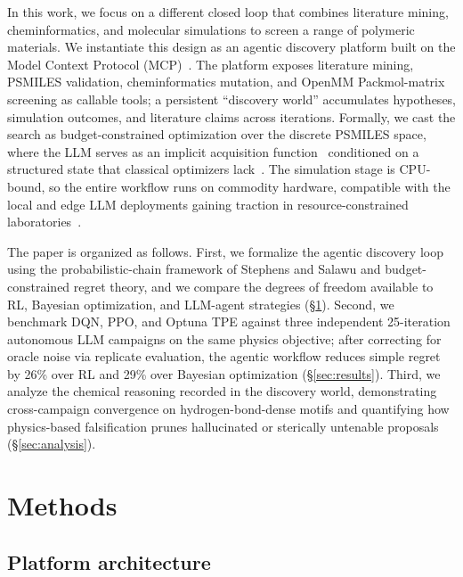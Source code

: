 \documentclass[twocolumn]{fairmeta}
\begin{document}
In this work, we focus on a different closed loop that combines literature mining, cheminformatics, and molecular simulations to screen a range of polymeric materials. We instantiate this design as an agentic discovery platform built on the Model Context Protocol (MCP)~\cite{mcp2024}.
The platform exposes literature mining, PSMILES validation, cheminformatics mutation, and OpenMM Packmol-matrix screening as callable tools; a persistent ``discovery world'' accumulates hypotheses, simulation outcomes, and literature claims across iterations.
Formally, we cast the search as budget-constrained optimization over the discrete PSMILES space, where the LLM serves as an implicit acquisition function~\cite{yang2024opro} conditioned on a structured state that classical optimizers lack~\cite{shahriari2016bayesopt}.
The simulation stage is CPU-bound, so the entire workflow runs on commodity hardware, compatible with the local and edge LLM deployments gaining traction in resource-constrained laboratories~\cite{xu2024ondevice}.

The paper is organized as follows.
First, we formalize the agentic discovery loop using the probabilistic-chain framework of Stephens and Salawu and budget-constrained regret theory, and we compare the degrees of freedom available to RL, Bayesian optimization, and LLM-agent strategies (\S\ref{sec:methods}).
Second, we benchmark DQN, PPO, and Optuna TPE against three independent 25-iteration autonomous LLM campaigns on the same physics objective; after correcting for oracle noise via replicate evaluation, the agentic workflow reduces simple regret by 26\% over RL and 29\% over Bayesian optimization (\S\ref{sec:results}).
Third, we analyze the chemical reasoning recorded in the discovery world, demonstrating cross-campaign convergence on hydrogen-bond-dense motifs and quantifying how physics-based falsification prunes hallucinated or sterically untenable proposals (\S\ref{sec:analysis}).

\section{Methods}
\label{sec:methods}

\subsection{Platform architecture}
\end{document}
